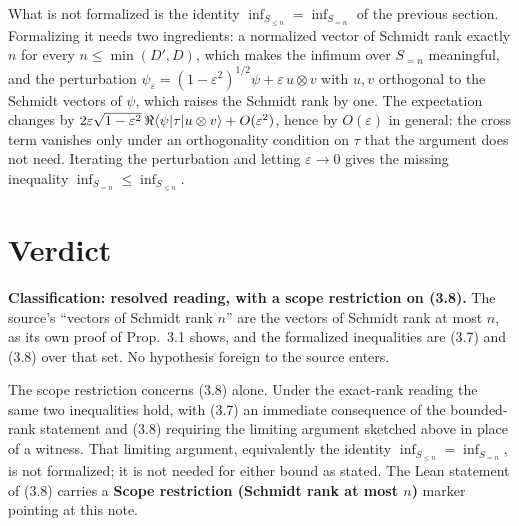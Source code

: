 \documentclass[11pt]{article}
\begin{document}
What is not formalized is the identity $\inf_{S_{\le n}}=\inf_{S_{=n}}$ of the
previous section. Formalizing it needs two ingredients: a normalized vector of
Schmidt rank exactly $n$ for every $n\le\min(D',D)$, which makes the infimum over
$S_{=n}$ meaningful, and the perturbation
$\psi_\varepsilon=(1-\varepsilon^2)^{1/2}\psi+\varepsilon\,u\otimes v$ with
$u,v$ orthogonal to the Schmidt vectors of $\psi$, which raises the Schmidt rank
by one. The expectation changes by
$2\varepsilon\sqrt{1-\varepsilon^2}\,\Re\langle \psi|\tau|u\otimes v\rangle
+O(\varepsilon^2)$, hence by $O(\varepsilon)$ in general: the cross term
vanishes only under an orthogonality condition on $\tau$ that the argument does
not need. Iterating the perturbation and letting $\varepsilon\to0$ gives the
missing inequality $\inf_{S_{=n}}\le\inf_{S_{\le n}}$.

\section{Verdict}

\textbf{Classification: resolved reading, with a scope restriction on (3.8).}
The source's ``vectors of Schmidt rank $n$'' are the vectors of Schmidt rank at
most $n$, as its own proof of Prop.~3.1 shows, and the formalized inequalities
are (3.7) and (3.8) over that set. No hypothesis foreign to the source enters.

The scope restriction concerns (3.8) alone. Under the exact-rank reading the
same two inequalities hold, with (3.7) an immediate consequence of the
bounded-rank statement and (3.8) requiring the limiting argument sketched above
in place of a witness. That limiting argument, equivalently the identity
$\inf_{S_{\le n}}=\inf_{S_{=n}}$, is not formalized; it is not needed for either
bound as stated. The Lean statement of (3.8) carries a
\textbf{Scope restriction (Schmidt rank at most $n$)} marker pointing at this
note.



\end{document}
